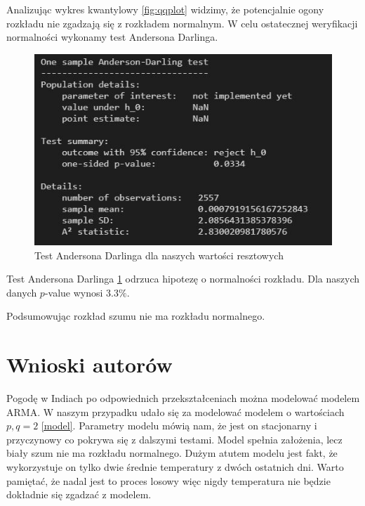 \documentclass[12pt]{article}
\theoremstyle{exer}
\begin{document}
Analizując wykres kwantylowy \ref{fig:qqplot} widzimy, że potencjalnie ogony rozkładu nie zgadzają się z rozkładem normalnym. W celu ostatecznej weryfikacji normalności wykonamy test Andersona Darlinga. 
\begin{figure}[H]
	\centering
	\includegraphics[width=3\columnwidth/4]{img/ad_test.png}
	\caption{Test Andersona Darlinga dla naszych wartości resztowych}
	\label{Test_AD}
\end{figure}
Test Andersona Darlinga \ref{Test_AD} odrzuca hipotezę o normalności rozkładu. Dla naszych danych $p$-value wynosi $3.3\%$. 

Podsumowując rozkład szumu nie ma rozkładu normalnego.
	\section{Wnioski autorów}
	Pogodę w Indiach po odpowiednich przekształceniach można modelować modelem ARMA. W naszym przypadku udało się za modelować modelem o wartościach $p,q = 2$ \ref{model}. Parametry modelu mówią nam, że jest on stacjonarny i przyczynowy co pokrywa się z dalszymi testami. Model spełnia założenia, lecz biały szum nie ma rozkładu normalnego. Dużym atutem modelu jest fakt, że wykorzystuje on tylko dwie średnie temperatury z dwóch ostatnich dni. Warto pamiętać, że nadal jest to proces losowy więc nigdy temperatura nie będzie dokładnie się zgadzać z modelem. 
	
\end{document}
